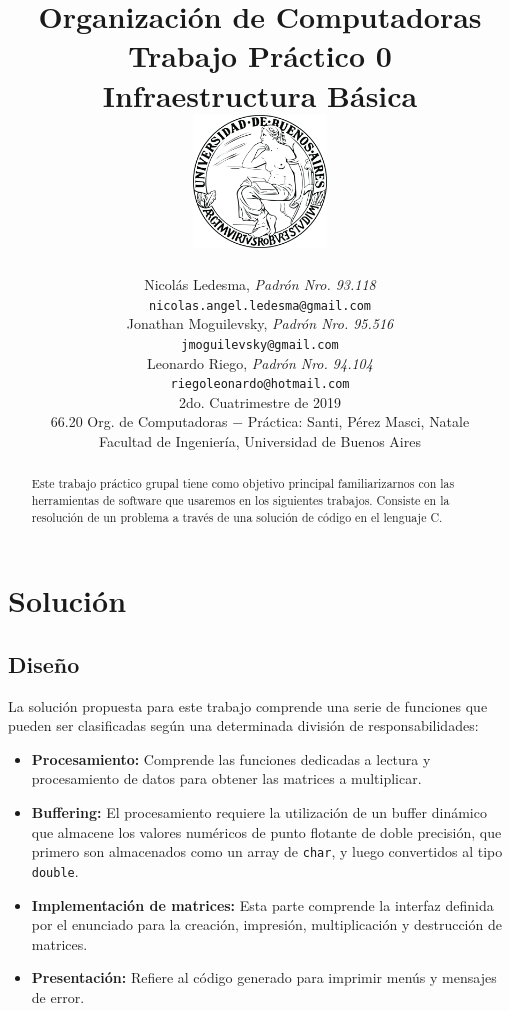 \documentclass[a4paper,10pt, spanish]{article}
\title{
            \large{Organización de Computadoras} \\
            \textbf{Trabajo Práctico 0} \\
            \textbf{Infraestructura Básica} \\
            \bigskip
            \includegraphics[max height=100pt,max width=100pt]{UBA.png} \\
}
\author{	Nicolás Ledesma, \textit{Padrón Nro. 93.118}                        \\
            \texttt{ nicolas.angel.ledesma@gmail.com }                           \\[2.5ex]
            Jonathan Moguilevsky, \textit{Padrón Nro. 95.516}                   \\
            \texttt{ jmoguilevsky@gmail.com }                                   \\[2.5ex]
            Leonardo Riego, \textit{Padrón Nro. 94.104}                 \\
            \texttt{ riegoleonardo@hotmail.com }                                          \\[2.5ex]
            \normalsize{2do. Cuatrimestre de 2019}                              \\
            \normalsize{66.20 Org. de Computadoras  
                $-$ Práctica: Santi, Pérez Masci, Natale }                      \\
            \normalsize{Facultad de Ingeniería, Universidad de Buenos Aires}    \\
       }
\date{}
\begin{document}
\maketitle

\thispagestyle{empty}   %


\begin{abstract}
Este trabajo práctico grupal tiene como objetivo principal familiarizarnos con las herramientas de software que usaremos en los siguientes trabajos. Consiste en la resolución de un problema a través de una solución de código en el lenguaje C.
\end{abstract}

\pagebreak




\section{Solución}

\subsection{Diseño}

La solución propuesta para este trabajo comprende una serie de funciones que pueden ser clasificadas según una determinada división de responsabilidades:

\begin{itemize}
	\item \textbf{Procesamiento:} Comprende las funciones dedicadas a lectura y procesamiento de datos para obtener las matrices a multiplicar.
  \item \textbf{Buffering:} El procesamiento requiere la utilización de un buffer dinámico que almacene los valores numéricos de punto flotante de doble precisión, que primero 
  son almacenados como un array de \lstinline{char}, y luego convertidos al tipo \lstinline{double}.
  \item \textbf{Implementación de matrices:} Esta parte comprende la interfaz definida por el enunciado para la creación, impresión, multiplicación y destrucción de matrices.
  \item \textbf{Presentación:} Refiere al código generado para imprimir menús y mensajes de error.
\end{itemize}
\end{document}
